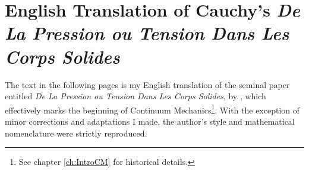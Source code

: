 \chapter{English Translation of Cauchy's \textit{De La Pression ou Tension Dans Les Corps Solides}}\label{ch:appA}

The text in the following pages is my English translation of the seminal paper entitled \textit{De La Pression ou Tension Dans Les Corps Solides}, by \cite{cauchySolid_1889}, which effectively marks the beginning of Continuum Mechanics\footnote{See chapter \ref{ch:IntroCM} for historical details.}. With the exception of minor corrections and adaptations I made, the author's style and mathematical nomenclature were strictly reproduced. 

